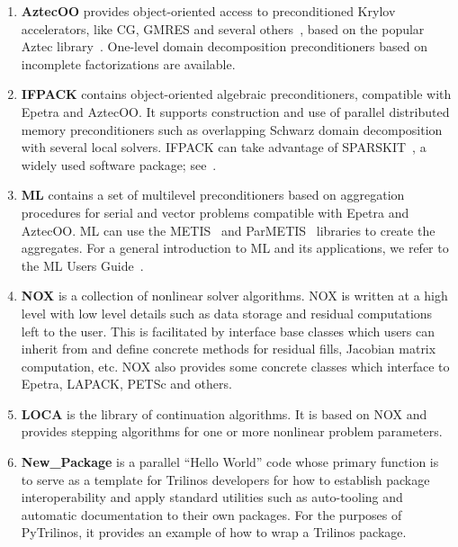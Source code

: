 \documentclass[acmtocl]{acmtrans2m}
\newcommand{\PyTrilinos}{{PyTrilinos}}
\begin{document}
\begin{enumerate}
\item {\bf AztecOO} provides object-oriented access to preconditioned
  Krylov accelerators, like CG, GMRES and several
  others~\cite{golub96matrix}, based on the popular Aztec
  library~\cite{aztecoo-guide}.  One-level domain decomposition
  preconditioners based on incomplete factorizations are available.

\item {\bf IFPACK} contains object-oriented algebraic preconditioners,
  compatible with Epetra and AztecOO.  It supports construction and
  use of parallel distributed memory preconditioners such as
  overlapping Schwarz domain decomposition with several local solvers.
  IFPACK can take advantage of SPARSKIT~\cite{sparskit}, a widely used
  software package; see~\cite{ifpack-guide}.

\item {\bf ML} contains a set of multilevel preconditioners based on
  aggregation procedures for serial and vector problems compatible
  with Epetra and AztecOO.  ML can use the METIS~\cite{metis} and
  ParMETIS~\cite{parmetis} libraries to create the aggregates.  For a
  general introduction to ML and its applications, we refer to the ML
  Users Guide~\cite{ml-guide}.

\item {\bf NOX} is a collection of nonlinear solver algorithms.  NOX
  is written at a high level with low level details such as data
  storage and residual computations left to the user.  This is
  facilitated by interface base classes which users can inherit from
  and define concrete methods for residual fills, Jacobian matrix
  computation, etc.  NOX also provides some concrete classes which
  interface to Epetra, LAPACK, PETSc and others.

\item {\bf LOCA} is the library of continuation algorithms.  It is
  based on NOX and provides stepping algorithms for one or more
  nonlinear problem parameters.

\item {\bf New\_Package} is a parallel ``Hello World'' code whose
  primary function is to serve as a template for Trilinos developers
  for how to establish package interoperability and apply standard
  utilities such as auto-tooling and
  automatic documentation to their own packages.  For the purposes of
  \PyTrilinos, it provides an example of how to wrap a Trilinos
  package.

\end{enumerate}
\end{document}
